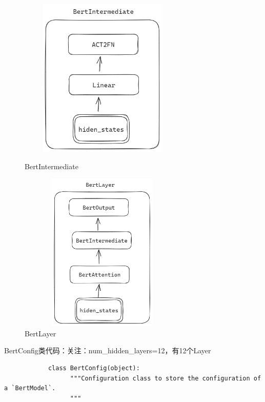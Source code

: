 \documentclass[a4paper]{article}
\begin{document}
\begin{sloppypar}
      \begin{figure}[H]
            \centering
            \begin{minipage}{0.49\linewidth}
                  \centering
                  \includegraphics[width=3.15in,height=3.0in]{BertIntermediate}
                  \caption{BertIntermediate}
                  \label{BertIntermediate}%
            \end{minipage}
            \begin{minipage}{0.49\linewidth}
                  \centering
                  \includegraphics[width=3.15in,height=3.0in]{BertLayer}
                  \caption{BertLayer}
                  \label{BertLayer}%
            \end{minipage}

      \end{figure}


      BertConfig类代码：关注：num\_hidden\_layers=12，有12个Layer

      \begin{lstlisting}
            class BertConfig(object):
                  """Configuration class to store the configuration of a `BertModel`.
                  """
            

\end{lstlisting}
\end{sloppypar}
\end{document}
